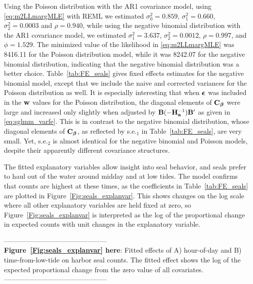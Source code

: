 \documentclass[12pt, titlepage]{article}
\begin{document}
Using the Poisson distribution with the AR1 covariance model, using \eqref{eq:m2LLmargMLE} with REML we estimated $\sigma^{2}_{0} = 0.859$, $\sigma^{2}_{1} = 0.660$, $\sigma^{2}_{2} = 0.0003$ and $\rho = 0.940$, while using the negative binomial distribution with the AR1 covariance model, we estimated $\sigma^{2}_{1} = 3.637$, $\sigma^{2}_{2} = 0.0012$, $\rho = 0.997$, and $\phi = 1.529$.  The minimized value of the likelihood in \eqref{eq:m2LLmargMLE} was 8416.11 for the Poisson distribution model, while it was 8242.07 for the negative binomial distribution, indicating that the negative binomial distribution was a better choice. Table~\ref{tab:FE_seals} gives fixed effects estimates for the negative binomial model, except that we include the naive and corrected variances for the Poisson distribution as well.  It is especially interesting that when $\mbox{\boldmath $\epsilon$}$ was included in the $\mathbf{w}$ values for the Poisson distribution, the diagonal elements of $\mathbf{C}_{\boldsymbol{\beta}}$ were large and increased only slightly when adjusted by $\mathbf{B}(-\mathbf{H}_{\mathbf{a}}^{-1})\mathbf{B}^{\prime}$ as given in \eqref{eq:sglmm_varfe}.  This is in contrast to the negative binomial distribution, whose diagonal elements of $\mathbf{C}_{\boldsymbol{\beta}}$, as reflected by s.e.$_{1}$ in Table~\ref{tab:FE_seals}, are very small.  Yet, s.e.$_{2}$ is almost identical for the negative binomial and Poisson models, despite their apparently different covariance structures.  


The fitted explanatory variables allow insight into seal behavior, and seals prefer to haul out of the water around midday and at low tides.  The model confirms that counts are highest at these times, as the coefficients in Table~\ref{tab:FE_seals} are plotted in Figure~\ref{Fig:seals_explanvar}.  This shows changes on the log scale where all other explanatory variables are held fixed at zero, so Figure~\ref{Fig:seals_explanvar} is interpreted as the log of the proportional change in expected counts with unit changes in the explanatory variable.

\begin{spacing}{0.8}
\vspace{.4cm}
\noindent --------------------------------------------- \\
\textbf{Figure~\ref{Fig:seals_explanvar} here}: Fitted effects of A) hour-of-day and B) time-from-low-tide on harbor seal counts.  The fitted effect shows the log of the expected proportional change from the zero value of all covariates. \\
--------------------------------------------- \\ 
\end{spacing}
\end{document}
